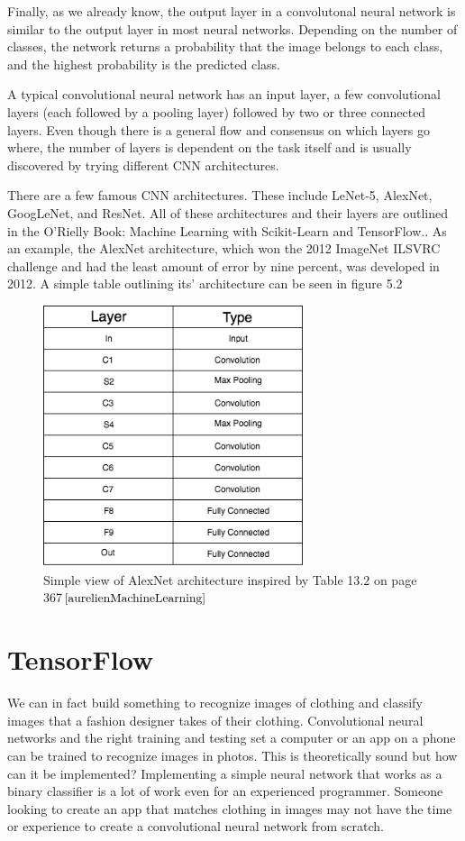 \documentclass[12pt]{report} %
\begin{document}
	Finally, as we already know, the output layer in a convolutonal neural network is similar to the output layer in most neural networks. Depending on the number of classes, the network returns a probability that the image belongs to each class, and the highest probability is the predicted class. 
	
	A typical convolutional neural network has an input layer, a few convolutional layers (each followed by a pooling layer) followed by two or three connected layers. Even though there is a general flow and consensus on which layers go where, the number of layers is dependent on the task itself and is usually discovered by trying different CNN architectures.
	
	There are a few famous CNN architectures. These include LeNet-5, AlexNet, GoogLeNet, and ResNet. All of these architectures and their layers are outlined in the O'Rielly Book: Machine Learning with Scikit-Learn and TensorFlow.\cite{aurelienMachineLearning}. As an example, the AlexNet architecture, which won the 2012 ImageNet ILSVRC challenge and had the least amount of error by nine percent, was developed in 2012. A simple table outlining its' architecture can be seen in figure 5.2
\begin{figure}
\centering
\includegraphics[width=3in]{alex_net_arch}
\caption{Simple view of AlexNet architecture inspired by Table 13.2 on page 367$\cite{aurelienMachineLearning}$}
\end{figure}		

\chapter{TensorFlow}
	We can in fact build something to recognize images of clothing and classify images that a fashion designer takes of their clothing. Convolutional neural networks and the right training and testing set a computer or an app on a phone can be trained to recognize images in photos. This is theoretically sound but how can it be implemented? Implementing a simple neural network that works as a binary classifier is a lot of work even for an experienced programmer. Someone looking to create an app that matches clothing in images may not have the time or experience to create a convolutional neural network from scratch. 
\end{document}
